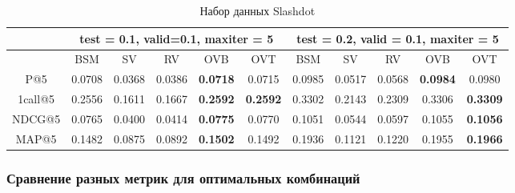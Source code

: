 \documentclass[a4paper,12pt]{article}
\begin{document}
\begin{table}[H]
\caption{Набор данных Slashdot}
\label{tab:movm}
\begin{tabular}{|c|c|c|c|c|c|c|c|c|c|c|}
\hline
& \multicolumn{5}{|c|}{test = 0.1, valid=0.1, maxiter = 5} & \multicolumn{5}{|c|}{test = 0.2, valid = 0.1, maxiter = 5}\\
\hline
  & BSM  & SV &  RV & OVB & OVT &BSM  & SV & RV & OVB & OVT \\
\hline
P@5 & 0.0708 & 0.0368 &	0.0386 & \textbf{0.0718} & 0.0715 & 0.0985 &	0.0517 & 0.0568 & \textbf{0.0984} & 0.0980\\
\hline
1call@5 & 0.2556 & 0.1611 & 0.1667 & \textbf{0.2592} & \textbf{0.2592} & 0.3302 & 0.2143 & 0.2309	& 0.3306 &\textbf{0.3309} \\
\hline
NDCG@5 & 0.0765 &	0.0400 & 0.0414	&\textbf{0.0775} & 0.0770 & 0.1051 & 0.0544	 & 0.0597 &	0.1055 & \textbf{0.1056}\\
\hline
MAP@5 & 0.1482 & 0.0875 & 0.0892 & \textbf{0.1502} & 0.1492  & 0.1936 & 0.1121 & 0.1220 & 0.1955	& \textbf{0.1966}\\
\hline
\end{tabular}
\end{table}

\subsubsection*{Сравнение разных метрик для оптимальных комбинаций}

\begin{table}[H]
\caption{Набор данных Movie Lens 100k}
\label{tab:movm}
\end{table}
\end{document}
